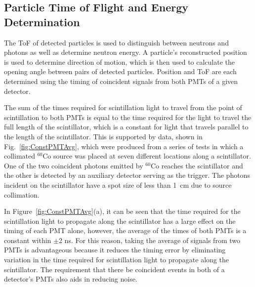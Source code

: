 
\subsection{Particle Time of Flight and Energy Determination}
\label{ToF_reconstruction}
The ToF of detected particles is used to distinguish between neutrons and photons as well as determine neutron energy.
A particle's reconstructed position is used to determine direction of motion, which is then used to calculate the opening angle between pairs of detected particles.
Position and ToF are each determined using the timing of coincident signals from both PMTs of a given detector.

The sum of the times required for scintillation light to travel from the point of scintillation to both PMTs is equal to the time required for the light to travel the full length of the scintillator, which is a constant for light that travels parallel to the length of the scintillator.
This is supported by data, shown in Fig.~\ref{fig:ConstPMTAvg}, which were produced from a series of tests in which a collimated $^{60}$Co source was placed at seven different locations along a scintillator.
One of the two coincident photons emitted by $^{60}$Co reaches the scintillator and the other is detected by an auxiliary detector serving as the trigger. 
The photons incident on the scintillator have a spot size of less than 1~cm due to source collimation.

In Figure~\ref{fig:ConstPMTAvg}(a), it can be seen that the time required for the scintillation light to propagate along the scintillator has a large effect on the timing of each PMT alone, however, the average of the times of both PMTs is a constant within $\pm$2 ns. %
For this reason, taking the average of signals from two PMTs is advantageous because it reduces the timing error by eliminating variation in the time required for scintillation light to propagate along the scintillator.
The requirement that there be coincident events in both of a detector's PMTs also aids in reducing noise.

